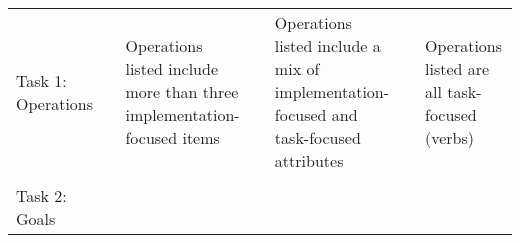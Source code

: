 \documentclass[]{article}
\begin{document}
\begin{longtable}[]{@{}lllllll@{}}
\begin{minipage}[t]{0.19\columnwidth}\raggedright
Task 1: Operations\strut
\end{minipage} & \begin{minipage}[t]{0.03\columnwidth}\raggedright
\strut
\end{minipage} & \begin{minipage}[t]{0.16\columnwidth}\raggedright
Operations listed include more than three implementation-focused
items\strut
\end{minipage} & \begin{minipage}[t]{0.03\columnwidth}\raggedright
\strut
\end{minipage} & \begin{minipage}[t]{0.19\columnwidth}\raggedright
Operations listed include a mix of implementation-focused and
task-focused attributes\strut
\end{minipage} & \begin{minipage}[t]{0.03\columnwidth}\raggedright
\strut
\end{minipage} & \begin{minipage}[t]{0.20\columnwidth}\raggedright
Operations listed are all task-focused (verbs)\strut
\end{minipage}\tabularnewline
\begin{minipage}[t]{0.19\columnwidth}\raggedright
\strut
\end{minipage} & \begin{minipage}[t]{0.03\columnwidth}\raggedright
\strut
\end{minipage} & \begin{minipage}[t]{0.16\columnwidth}\raggedright
\strut
\end{minipage} & \begin{minipage}[t]{0.03\columnwidth}\raggedright
\strut
\end{minipage} & \begin{minipage}[t]{0.19\columnwidth}\raggedright
\strut
\end{minipage} & \begin{minipage}[t]{0.03\columnwidth}\raggedright
\strut
\end{minipage} & \begin{minipage}[t]{0.20\columnwidth}\raggedright
\strut
\end{minipage}\tabularnewline
\begin{minipage}[t]{0.19\columnwidth}\raggedright
Task 2: Goals\strut
\end{minipage} & \begin{minipage}[t]{0.03\columnwidth}\raggedright

\end{minipage}
\end{longtable}
\end{document}
